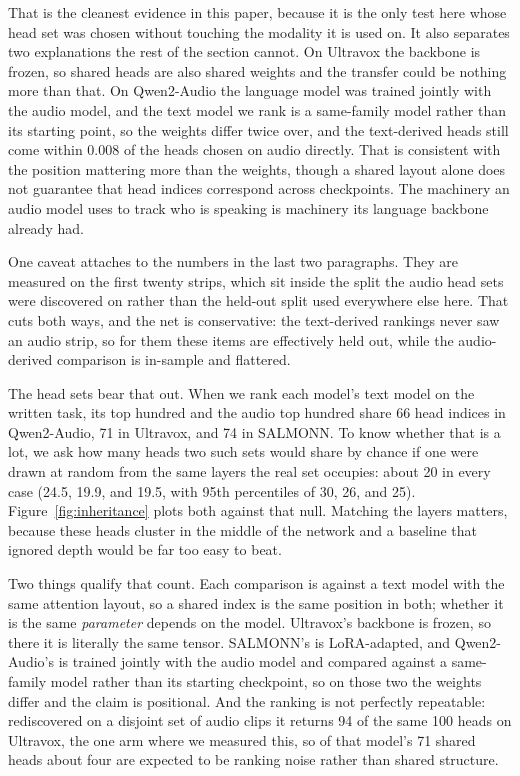 \documentclass[11pt]{article}
\begin{document}
That is the cleanest evidence in this paper, because it is the only test here
whose head set was chosen without touching the modality it is used on. It also
separates two explanations the rest of the section cannot. On Ultravox the
backbone is frozen, so shared heads are also shared weights and the transfer
could be nothing more than that. On Qwen2-Audio the language model was trained
jointly with the audio model, and the text model we rank is a same-family model
rather than its starting point, so the weights differ twice over, and the
text-derived heads
still come within 0.008 of the heads chosen on audio directly. That is consistent with the position mattering more than the weights, though a
shared layout alone does not guarantee that head indices correspond across
checkpoints. The machinery an audio model uses
to track who is speaking is machinery its language backbone already had.

One caveat attaches to the numbers in the last two paragraphs. They are measured on the first twenty
strips, which sit inside the split the audio head sets were discovered on rather
than the held-out split used everywhere else here. That cuts both ways, and the
net is conservative: the text-derived rankings never saw an audio strip, so for
them these items are effectively held out, while the audio-derived comparison is
in-sample and flattered.

The head sets bear that out. When we rank each model's text model on
the written task, its top hundred and the audio top hundred share 66 head indices
in Qwen2-Audio, 71 in Ultravox, and 74 in SALMONN. To know whether that
is a lot, we ask how many heads two such sets would share by chance if one were
drawn at random from the same layers the real set occupies: about 20 in every
case (24.5, 19.9, and 19.5, with 95th percentiles of 30, 26, and 25).
Figure~\ref{fig:inheritance} plots both against that null. Matching
the layers matters, because these heads cluster in the middle of the network and
a baseline that ignored depth would be far too easy to beat.

Two things qualify that count. Each comparison is against a text model with the
same attention layout, so a shared index is the same position in both; whether it is the same
\emph{parameter} depends on the model. Ultravox's backbone is frozen, so there it
is literally the same tensor. SALMONN's is LoRA-adapted, and Qwen2-Audio's is
trained jointly with the audio model and compared against a same-family model
rather than its starting checkpoint, so on those two the weights differ and the claim is
positional. And the ranking is not perfectly repeatable: rediscovered on a disjoint set of
audio clips it returns 94 of the same 100 heads on Ultravox, the one arm where we
measured this, so of that model's 71 shared heads about four are expected to be
ranking noise rather than shared structure.
\end{document}
